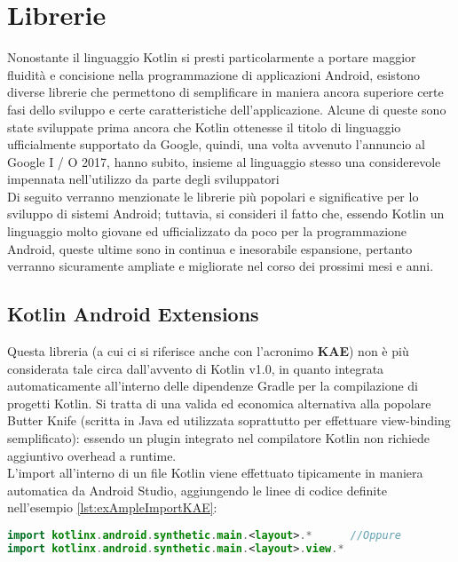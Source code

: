 \section{Librerie}
Nonostante il linguaggio Kotlin si presti particolarmente a portare maggior fluidità e concisione nella programmazione di applicazioni Android, esistono diverse librerie che permettono di semplificare in maniera ancora superiore certe fasi dello sviluppo e certe caratteristiche dell'applicazione. Alcune di queste sono state sviluppate prima ancora che Kotlin ottenesse il titolo di linguaggio ufficialmente supportato da Google, quindi, una volta avvenuto l'annuncio al Google I / O 2017, hanno subito, insieme al linguaggio stesso una considerevole impennata nell'utilizzo da parte degli sviluppatori\\
Di seguito verranno menzionate le librerie più popolari e significative per lo sviluppo di sistemi Android; tuttavia, si consideri il fatto che, essendo Kotlin un linguaggio molto giovane ed ufficializzato da poco per la programmazione Android, queste ultime sono in continua e inesorabile espansione, pertanto verranno sicuramente ampliate e migliorate nel corso dei prossimi mesi e anni.\\

\subsection{Kotlin Android Extensions}
Questa libreria (a cui ci si riferisce anche con l’acronimo {\bfseries KAE}) non è più considerata tale circa dall'avvento di Kotlin v1.0, in quanto integrata automaticamente all'interno delle dipendenze Gradle per la compilazione di progetti Kotlin. Si tratta di una valida ed economica alternativa alla popolare Butter Knife (scritta in Java ed utilizzata soprattutto per effettuare view-binding semplificato): essendo un plugin integrato nel compilatore Kotlin non richiede aggiuntivo overhead a runtime.\\
L'import all'interno di un file Kotlin viene effettuato tipicamente in maniera automatica da Android Studio, aggiungendo le linee di codice definite nell'esempio \ref{lst:exAmpleImportKAE}:\\

\begin{lstlisting}[caption={Import delle Kotlin Android Extensions}, captionpos=b, label={lst:exAmpleImportKAE}, language=Kotlin]
import kotlinx.android.synthetic.main.<layout>.*      //Oppure
import kotlinx.android.synthetic.main.<layout>.view.*
\end{lstlisting}

